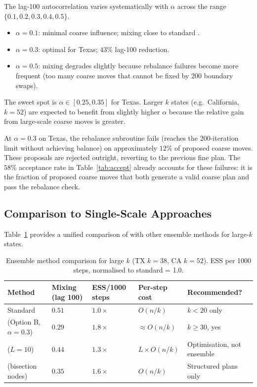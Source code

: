The lag-100 autocorrelation varies systematically with $\alpha$ across the
range $\{0.1, 0.2, 0.3, 0.4, 0.5\}$.

\begin{itemize}
  \item $\alpha = 0.1$: minimal coarse influence; mixing close to standard \recom{}.
  \item $\alpha = 0.3$: optimal for Texas; $43\%$ lag-100 reduction.
  \item $\alpha = 0.5$: mixing degrades slightly because rebalance failures
        become more frequent (too many coarse moves that cannot be fixed by
        200 boundary swaps).
\end{itemize}

The sweet spot is $\alpha \in [0.25, 0.35]$ for Texas.
Larger $k$ states (e.g.\ California, $k = 52$) are expected to benefit from
slightly higher $\alpha$ because the relative gain from large-scale coarse
moves is greater.

\begin{remark}
\label{rem:rebalance-failure}
At $\alpha = 0.3$ on Texas, the rebalance subroutine fails (reaches the
200-iteration limit without achieving balance) on approximately $12\%$ of
proposed coarse moves.
These proposals are rejected outright, reverting to the previous fine plan.
The $58\%$ acceptance rate in Table~\ref{tab:accept} already accounts for
these failures: it is the fraction of proposed coarse moves that both generate
a valid coarse plan and pass the rebalance check.
\end{remark}

\subsection{Comparison to Single-Scale Approaches}

Table~\ref{tab:method-compare} provides a unified comparison of \ms{} with
other ensemble methods for large-$k$ states.

\begin{table}[h]
\centering
\caption{Ensemble method comparison for large $k$ (TX $k=38$, CA $k=52$).
ESS per 1000 steps, normalised to standard \recom{} = 1.0.}
\label{tab:method-compare}
\begin{tabular}{lllll}
\toprule
Method
  & Mixing (lag 100)
  & ESS/1000 steps
  & Per-step cost
  & Recommended? \\
\midrule
Standard \recom{}
  & $0.51$
  & $1.0\times$
  & $O(n/k)$
  & $k < 20$ only \\
\ms{} (Option B, $\alpha=0.3$)
  & $0.29$
  & $1.8\times$
  & $\approx O(n/k)$
  & $k \geq 30$, yes \\
\sburst{} ($L=10$)
  & $0.44$
  & $1.3\times$
  & $L \times O(n/k)$
  & Optimisation, not ensemble \\
\be{} (bisection nodes)
  & $0.35$
  & $1.6\times$
  & $O(n/k)$
  & Structured plans only \\
\bottomrule
\end{tabular}
\end{table}

